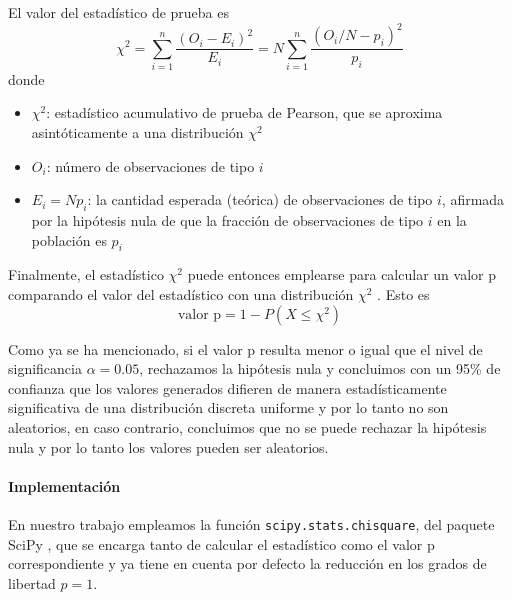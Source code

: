El valor del estadístico de prueba es
\begin{equation}
\label{eq:estadistico-chi2}
\chi^{2} = \sum_{i=1}^{n}{\frac{(O_{i}-E_{i})^{2}}{E_{i}}} = N\sum_{i=1}^{n}{\frac{\left(O_{i}/N-p_{i}\right)^{2}}{p_{i}}}
\end{equation}
donde
\begin{itemize}
  \item $\chi^2$: estadístico acumulativo de prueba de Pearson, que se aproxima asintóticamente a una distribución $\chi^{2}$
  \item $O_{i}$: número de observaciones de tipo $i$
  \item $E_{i} = Np_{i}$: la cantidad esperada (teórica) de observaciones de tipo $i$, afirmada por la hipótesis nula de que la fracción de observaciones de tipo $i$ en la población es $p_{i}$
\end{itemize}

Finalmente, el estadístico $\chi^{2}$ puede entonces emplearse para calcular un valor p comparando el valor del estadístico con una distribución $\chi^{2}$ \cite{enwiki2022pearson}. Esto es
\begin{equation}
  \label{eq:p-value}
  \text{valor p} = 1 - P(X \le \chi^2)
\end{equation}

Como ya se ha mencionado, si el valor p resulta menor o igual que el nivel de significancia $\alpha = 0.05$, rechazamos la hipótesis nula y concluimos con un 95\% de confianza que los valores generados difieren de manera estadísticamente significativa de una distribución discreta uniforme y por lo tanto no son aleatorios, en caso contrario, concluimos que no se puede rechazar la hipótesis nula y por lo tanto los valores pueden ser aleatorios.

\paragraph{Implementación}
En nuestro trabajo empleamos la función \texttt{scipy.stats.chisquare}, del paquete SciPy \cite{scipy2021chisquare}, que se encarga tanto de calcular el estadístico como el valor p correspondiente y ya tiene en cuenta por defecto la reducción en los grados de libertad $p = 1$.
